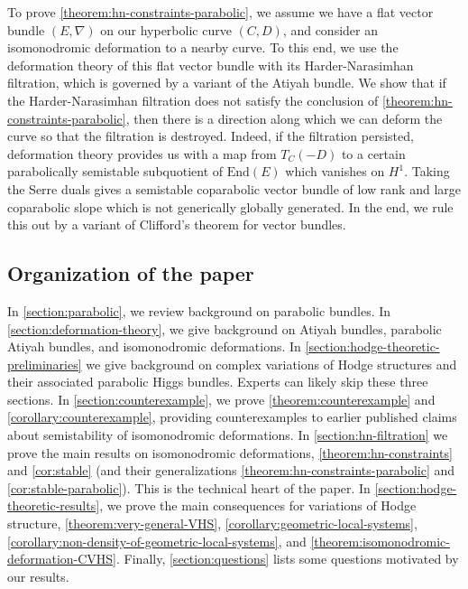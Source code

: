\documentclass[12 pt]{amsart}
\theoremstyle{plain}
\theoremstyle{definition}
\theoremstyle{remark}
\numberwithin{equation}{section}
\begin{document}
To prove \autoref{theorem:hn-constraints-parabolic}, we assume we have a flat
vector bundle $(E, \nabla)$ on our hyperbolic curve $(C, D)$, and consider an
isomonodromic deformation to a nearby curve.
To this end, we use the deformation theory of this flat vector bundle with its Harder-Narasimhan filtration,
which is governed by a variant of the Atiyah bundle.
We show that if the Harder-Narasimhan filtration does not satisfy the conclusion of \autoref{theorem:hn-constraints-parabolic}, then there is a direction along which we can deform the curve so that
the filtration is destroyed.
Indeed, if the filtration persisted, deformation theory provides us with a map
from $T_C(-D)$ to a certain
parabolically semistable subquotient of $\mathrm{End}(E)$ which vanishes on $H^1$.
Taking the Serre duals gives a semistable coparabolic vector bundle of low rank
and large coparabolic slope
which is not generically globally generated.
In the end, we rule this out by a variant of Clifford's theorem for vector
bundles.


\subsection{Organization of the paper}
\label{subsection:organization}
In \autoref{section:parabolic}, we review background on parabolic bundles.
In \autoref{section:deformation-theory}, we give background on Atiyah bundles,
parabolic Atiyah bundles, and isomonodromic deformations. 
In \autoref{section:hodge-theoretic-preliminaries} we give background on complex variations of Hodge structures and their associated parabolic Higgs bundles. Experts can likely skip these three sections. 
In \autoref{section:counterexample}, we prove \autoref{theorem:counterexample} and \autoref{corollary:counterexample}, providing counterexamples to earlier published claims about semistability of isomonodromic deformations. 
In \autoref{section:hn-filtration} we prove the main results on isomonodromic
deformations, \autoref{theorem:hn-constraints} and \autoref{cor:stable} (and their generalizations \autoref{theorem:hn-constraints-parabolic} and \autoref{cor:stable-parabolic}). This is the technical heart of the paper. 
In \autoref{section:hodge-theoretic-results}, we prove the main consequences for
variations of Hodge structure, \autoref{theorem:very-general-VHS}, \autoref{corollary:geometric-local-systems}, \autoref{corollary:non-density-of-geometric-local-systems}, and \autoref{theorem:isomonodromic-deformation-CVHS}. 
Finally, \autoref{section:questions} lists some questions motivated by our results.
\end{document}
